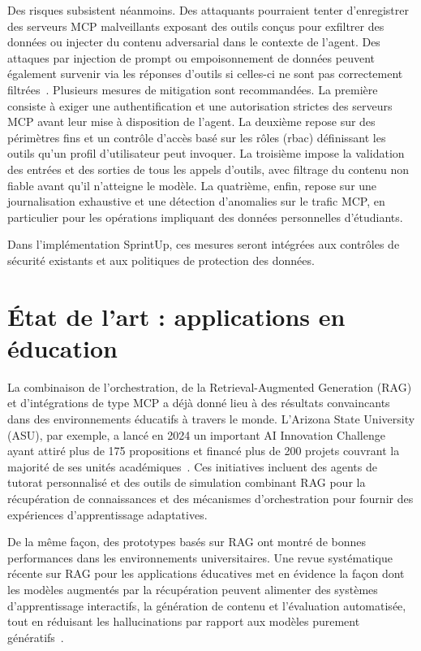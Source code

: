 Des risques subsistent néanmoins. Des attaquants pourraient tenter d'enregistrer des
serveurs MCP malveillants exposant des outils conçus pour exfiltrer des données ou
injecter du contenu adversarial dans le contexte de l'agent. Des attaques par injection
de prompt ou empoisonnement de données peuvent également survenir via les réponses
d'outils si celles-ci ne sont pas correctement filtrées~\cite{mcpsecurity}.
Plusieurs mesures de mitigation sont recommandées. La première
consiste à exiger une authentification et une autorisation strictes
des serveurs MCP avant leur mise à disposition de l'agent. La
deuxième repose sur des périmètres fins et un contrôle d'accès basé
sur les rôles (\acrshort{rbac}) définissant les outils qu'un profil
d'utilisateur peut invoquer. La troisième impose la validation des
entrées et des sorties de tous les appels d'outils, avec filtrage
du contenu non fiable avant qu'il n'atteigne le modèle. La
quatrième, enfin, repose sur une journalisation exhaustive et une
détection d'anomalies sur le trafic MCP, en particulier pour les
opérations impliquant des données personnelles d'étudiants.

Dans l'implémentation SprintUp, ces mesures seront intégrées aux contrôles de sécurité
existants et aux politiques de protection des données.

\section{État de l'art : applications en éducation}

La combinaison de l'orchestration, de la Retrieval-Augmented Generation (RAG) et
d'intégrations de type MCP a déjà donné lieu à des résultats convaincants dans des
environnements éducatifs à travers le monde. L'Arizona State University (ASU), par
exemple, a lancé en 2024 un important \og{}AI Innovation Challenge\fg{} ayant attiré
plus de 175 propositions et financé plus de 200 projets couvrant la majorité de ses
unités académiques~\cite{asu2024}. Ces initiatives incluent des agents de tutorat
personnalisé et des outils de simulation combinant RAG pour la récupération de
connaissances et des mécanismes d'orchestration pour fournir des expériences
d'apprentissage adaptatives.

De la même façon, des prototypes basés sur RAG ont montré de bonnes performances dans
les environnements universitaires. Une revue systématique récente sur RAG pour les
applications éducatives met en évidence la façon dont les modèles augmentés par la
récupération peuvent alimenter des systèmes d'apprentissage interactifs, la génération
de contenu et l'évaluation automatisée, tout en réduisant les hallucinations par rapport
aux modèles purement génératifs~\cite{rageducation,lirageducation}.

